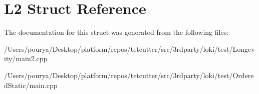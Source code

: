 \hypertarget{structL2}{}\section{L2 Struct Reference}
\label{structL2}


The documentation for this struct was generated from the following files\+:\begin{DoxyCompactItemize}
\item 
/\+Users/pourya/\+Desktop/platform/repos/tetcutter/src/3rdparty/loki/test/\+Longevity/main2.\+cpp\item 
/\+Users/pourya/\+Desktop/platform/repos/tetcutter/src/3rdparty/loki/test/\+Ordered\+Static/main.\+cpp\end{DoxyCompactItemize}
